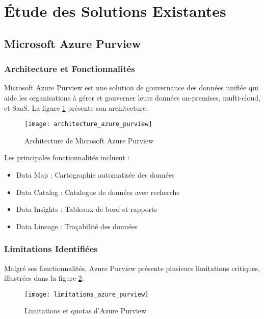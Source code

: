 \section{Étude des Solutions Existantes}

\subsection{Microsoft Azure Purview}

\subsubsection{Architecture et Fonctionnalités}

Microsoft Azure Purview est une solution de gouvernance des données unifiée qui aide les organisations à gérer et gouverner leurs données on-premises, multi-cloud, et SaaS. La figure \ref{fig:architecture_purview} présente son architecture.

\begin{figure}[htpb]
\centering
\texttt{[image: architecture\_azure\_purview]}
\caption{Architecture de Microsoft Azure Purview}
\label{fig:architecture_purview}
\end{figure}

Les principales fonctionnalités incluent :
\begin{itemize}
    \item Data Map : Cartographie automatisée des données
    \item Data Catalog : Catalogue de données avec recherche
    \item Data Insights : Tableaux de bord et rapports
    \item Data Lineage : Traçabilité des données
\end{itemize}

\subsubsection{Limitations Identifiées}

Malgré ses fonctionnalités, Azure Purview présente plusieurs limitations critiques, illustrées dans la figure \ref{fig:limitations_purview}.

\begin{figure}[htpb]
\centering
\texttt{[image: limitations\_azure\_purview]}
\caption{Limitations et quotas d'Azure Purview}
\label{fig:limitations_purview}
\end{figure}

